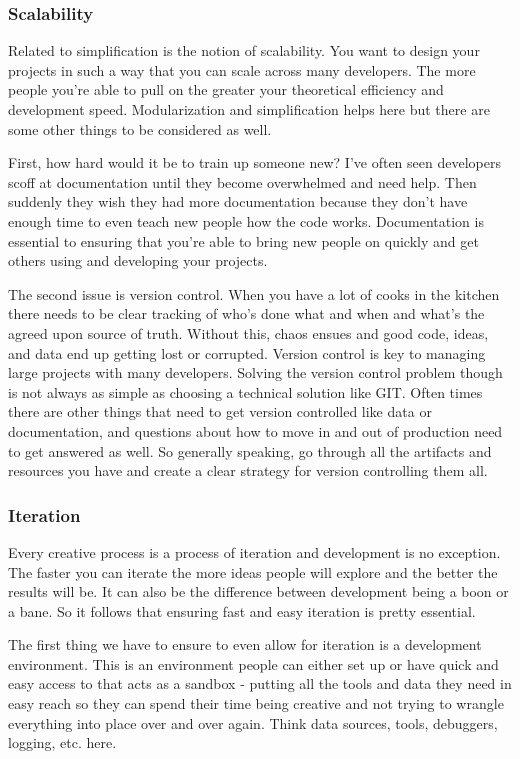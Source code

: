 \documentclass[10pt,a5paper]{book}
\begin{document}
\subsubsection{Scalability}
Related to simplification is the notion of scalability. You want to design your projects in such a way that you can scale across many developers. The more people you're able to pull on the greater your theoretical efficiency and development speed. Modularization and simplification helps here but there are some other things to be considered as well.

First, how hard would it be to train up someone new? I've often seen developers scoff at documentation until they become overwhelmed and need help. Then suddenly they wish they had more documentation because they don't have enough time to even teach new people how the code works. Documentation is essential to ensuring that you're able to bring new people on quickly and get others using and developing your projects. 

The second issue is version control. When you have a lot of cooks in the kitchen there needs to be clear tracking of who's done what and when and what's the agreed upon source of truth. Without this, chaos ensues and good code, ideas, and data end up getting lost or corrupted. Version control is key to managing large projects with many developers. Solving the version control problem though is not always as simple as choosing a technical solution like GIT. Often times there are other things that need to get version controlled like data or documentation, and questions about how to move in and out of production need to get answered as well. So generally speaking, go through all the artifacts and resources you have and create a clear strategy for version controlling them all. 

\subsubsection{Iteration}
Every creative process is a process of iteration and development is no exception. The faster you can iterate the more ideas people will explore and the better the results will be. It can also be the difference between development being a boon or a bane. So it follows that ensuring fast and easy iteration is pretty essential.

The first thing we have to ensure to even allow for iteration is a development environment. This is an environment people can either set up or have quick and easy access to that acts as a sandbox - putting all the tools and data they need in easy reach so they can spend their time being creative and not trying to wrangle everything into place over and over again. Think data sources, tools, debuggers, logging, etc. here. 
\end{document}
